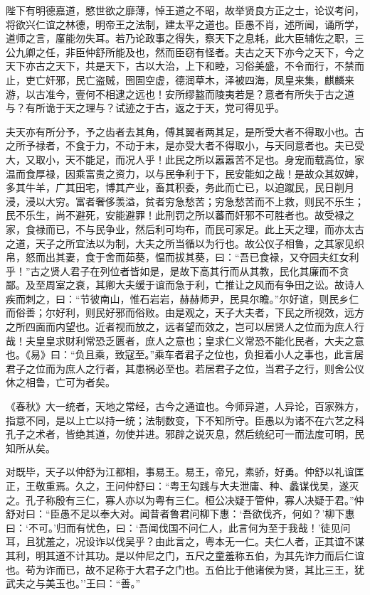 \documentclass[]{article}
\begin{document}
陛下有明德嘉道，愍世欲之靡薄，悼王道之不昭，故举贤良方正之士，论议考问，将欲兴仁谊之林德，明帝王之法制，建太平之道也。臣愚不肖，述所闻，诵所学，道师之言，廑能勿失耳。若乃论政事之得失，察天下之息耗，此大臣辅佐之职，三公九卿之任，非臣仲舒所能及也，然而臣窃有怪者。夫古之天下亦今之天下，今之天下亦古之天下，共是天下，古以大治，上下和睦，习俗美盛，不令而行，不禁而止，吏亡奸邪，民亡盗贼，囹圄空虚，德润草木，泽被四海，凤皇来集，麒麟来游，以古准今，壹何不相逮之远也！安所缪盭而陵夷若是？意者有所失于古之道与？有所诡于天之理与？试迹之于古，返之于天，党可得见乎。

夫天亦有所分予，予之齿者去其角，傅其翼者两其足，是所受大者不得取小也。古之所予禄者，不食于力，不动于末，是亦受大者不得取小，与天同意者也。夫已受大，又取小，天不能足，而况人乎！此民之所以嚣嚣苦不足也。身宠而载高位，家温而食厚禄，因乘富贵之资力，以与民争利于下，民安能如之哉！是故众其奴婢，多其牛羊，广其田宅，博其产业，畜其积委，务此而亡已，以迫蹴民，民日削月浸，浸以大穷。富者奢侈羡溢，贫者穷急愁苦；穷急愁苦而不上救，则民不乐生；民不乐生，尚不避死，安能避罪！此刑罚之所以蕃而奸邪不可胜者也。故受禄之家，食禄而已，不与民争业，然后利可均布，而民可家足。此上天之理，而亦太古之道，天子之所宜法以为制，大夫之所当循以为行也。故公仪子相鲁，之其家见织帛，怒而出其妻，食于舍而茹葵，愠而拔其葵，曰：``吾已食禄，又夺园夫红女利乎！''古之贤人君子在列位者皆如是，是故下高其行而从其教，民化其廉而不贪鄙。及至周室之衰，其卿大夫缓于谊而急于利，亡推让之风而有争田之讼。故诗人疾而刺之，曰：``节彼南山，惟石岩岩，赫赫师尹，民具尔瞻。''尔好谊，则民乡仁而俗善；尔好利，则民好邪而俗败。由是观之，天子大夫者，下民之所视效，远方之所四面而内望也。近者视而放之，远者望而效之，岂可以居贤人之位而为庶人行哉！夫皇皇求财利常恐乏匮者，庶人之意也；皇求仁义常恐不能化民者，大夫之意也。《易》曰：``负且乘，致寇至。''乘车者君子之位也，负担着小人之事也，此言居君子之位而为庶人之行者，其患祸必至也。若居君子之位，当君子之行，则舍公仪休之相鲁，亡可为者矣。

《春秋》大一统者，天地之常经，古今之通谊也。今师异道，人异论，百家殊方，指意不同，是以上亡以持一统；法制数变，下不知所守。臣愚以为诸不在六艺之科孔子之术者，皆绝其道，勿使并进。邪辟之说灭息，然后统纪可一而法度可明，民知所从矣。

对既毕，天子以仲舒为江都相，事易王。易王，帝兄，素骄，好勇。仲舒以礼谊匡正，王敬重焉。久之，王问仲舒曰：``粤王勾践与大夫泄庸、种、蠡谋伐吴，遂灭之。孔子称殷有三仁，寡人亦以为粤有三仁。桓公决疑于管仲，寡人决疑于君。''仲舒对曰：``臣愚不足以奉大对。闻昔者鲁君问柳下惠：`吾欲伐齐，何如？'柳下惠曰：`不可。'归而有忧色，曰：`吾闻伐国不问仁人，此言何为至于我哉！'徒见问耳，且犹羞之，况设诈以伐吴乎？由此言之，粤本无一仁。夫仁人者，正其谊不谋其利，明其道不计其功。是以仲尼之门，五尺之童羞称五伯，为其先诈力而后仁谊也。苟为诈而已，故不足称于大君子之门也。五伯比于他诸侯为贤，其比三王，犹武夫之与美玉也。''王曰：``善。''
\end{document}
